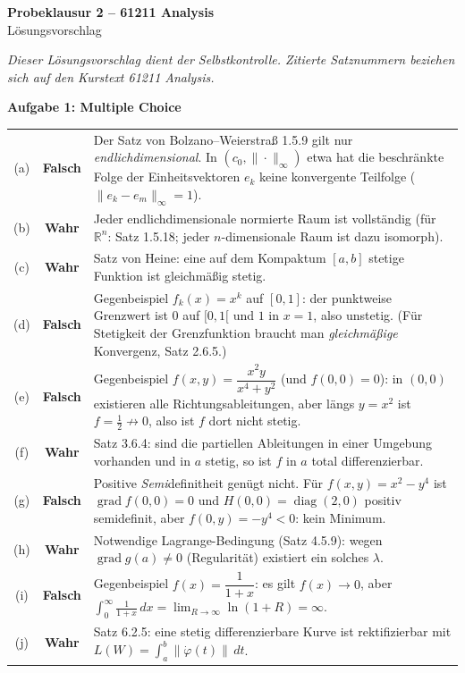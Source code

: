\documentclass[a4paper,12pt]{article}
\newcommand{\aufgabe}[2]{%
  \bigskip\par\noindent\textbf{Aufgabe #1: #2}\par\nobreak\medskip}
\begin{document}
\begin{center}
  {\LARGE\bfseries Probeklausur 2 -- 61211 Analysis}\\[0.4em]
  {\large Lösungsvorschlag}
\end{center}

\medskip
\noindent\textit{Dieser Lösungsvorschlag dient der Selbstkontrolle. Zitierte Satznummern
beziehen sich auf den Kurstext 61211 Analysis.}

\aufgabe{1}{Multiple Choice}

\renewcommand{\arraystretch}{1.5}
\noindent\begin{tabular}{@{}c@{\hspace{0.8em}}c@{\hspace{0.8em}}p{12.4cm}@{}}
  (a) & \textbf{Falsch} & Der Satz von Bolzano--Weierstraß 1.5.9 gilt nur \emph{endlichdimensional}. In $(c_0,\|\cdot\|_\infty)$ etwa hat die beschränkte Folge der Einheitsvektoren $e_k$ keine konvergente Teilfolge ($\|e_k-e_m\|_\infty=1$).\\
  (b) & \textbf{Wahr} & Jeder endlichdimensionale normierte Raum ist vollständig (für $\mathbb{R}^n$: Satz 1.5.18; jeder $n$-dimensionale Raum ist dazu isomorph).\\
  (c) & \textbf{Wahr} & Satz von Heine: eine auf dem Kompaktum $[a,b]$ stetige Funktion ist gleichmäßig stetig.\\
  (d) & \textbf{Falsch} & Gegenbeispiel $f_k(x)=x^k$ auf $[0,1]$: der punktweise Grenzwert ist $0$ auf $[0,1[$ und $1$ in $x=1$, also unstetig. (Für Stetigkeit der Grenzfunktion braucht man \emph{gleichmäßige} Konvergenz, Satz 2.6.5.)\\
  (e) & \textbf{Falsch} & Gegenbeispiel $f(x,y)=\dfrac{x^2y}{x^4+y^2}$ (und $f(0,0)=0$): in $(0,0)$ existieren alle Richtungsableitungen, aber längs $y=x^2$ ist $f=\tfrac12\not\to 0$, also ist $f$ dort nicht stetig.\\
  (f) & \textbf{Wahr} & Satz 3.6.4: sind die partiellen Ableitungen in einer Umgebung vorhanden und in $a$ stetig, so ist $f$ in $a$ total differenzierbar.\\
  (g) & \textbf{Falsch} & Positive \emph{Semi}definitheit genügt nicht. Für $f(x,y)=x^2-y^4$ ist $\operatorname{grad} f(0,0)=0$ und $H(0,0)=\operatorname{diag}(2,0)$ positiv semidefinit, aber $f(0,y)=-y^4<0$: kein Minimum.\\
  (h) & \textbf{Wahr} & Notwendige Lagrange-Bedingung (Satz 4.5.9): wegen $\operatorname{grad} g(a)\neq 0$ (Regularität) existiert ein solches $\lambda$.\\
  (i) & \textbf{Falsch} & Gegenbeispiel $f(x)=\dfrac{1}{1+x}$: es gilt $f(x)\to 0$, aber $\int_0^\infty \tfrac{1}{1+x}\,dx=\lim_{R\to\infty}\ln(1+R)=\infty$.\\
  (j) & \textbf{Wahr} & Satz 6.2.5: eine stetig differenzierbare Kurve ist rektifizierbar mit $L(W)=\int_a^b\|\dot\varphi(t)\|\,dt$.\\
\end{tabular}
\end{document}
